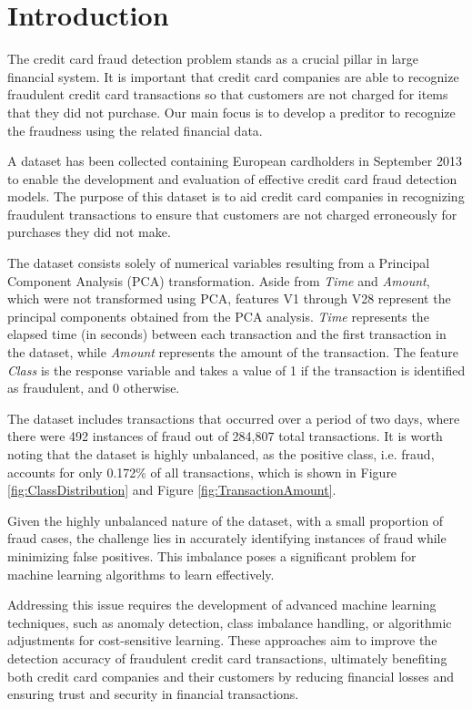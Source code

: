 
\section{Introduction}
\label{sec:intro}

The credit card fraud detection problem stands as a crucial pillar in large financial system. It is important that credit card companies are able to recognize fraudulent credit card transactions so that customers are not charged for items that they did not purchase. Our main focus is to develop a preditor to recognize the fraudness using the related financial data.

A dataset has been collected containing European cardholders in September 2013 to enable the development and evaluation of effective credit card fraud detection models. The purpose of this dataset is to aid credit card companies in recognizing fraudulent transactions to ensure that customers are not charged erroneously for purchases they did not make.

The dataset consists solely of numerical variables resulting from a Principal Component Analysis (PCA) transformation. Aside from \textit{Time} and \textit{Amount}, which were not transformed using PCA, features V1 through V28 represent the principal components obtained from the PCA analysis. \textit{Time} represents the elapsed time (in seconds) between each transaction and the first transaction in the dataset, while \textit{Amount} represents the amount of the transaction. The feature \textit{Class} is the response variable and takes a value of 1 if the transaction is identified as fraudulent, and 0 otherwise.

The dataset includes transactions that occurred over a period of two days, where there were 492 instances of fraud out of 284,807 total transactions. It is worth noting that the dataset is highly unbalanced, as the positive class, i.e. fraud, accounts for only 0.172\% of all transactions, which is shown in Figure \ref{fig:ClassDistribution} and Figure \ref{fig:TransactionAmount}.

Given the highly unbalanced nature of the dataset, with a small proportion of fraud cases, the challenge lies in accurately identifying instances of fraud while minimizing false positives. This imbalance poses a significant problem for machine learning algorithms to learn effectively.


Addressing this issue requires the development of advanced machine learning techniques, such as anomaly detection, class imbalance handling, or algorithmic adjustments for cost-sensitive learning. These approaches aim to improve the detection accuracy of fraudulent credit card transactions, ultimately benefiting both credit card companies and their customers by reducing financial losses and ensuring trust and security in financial transactions.

